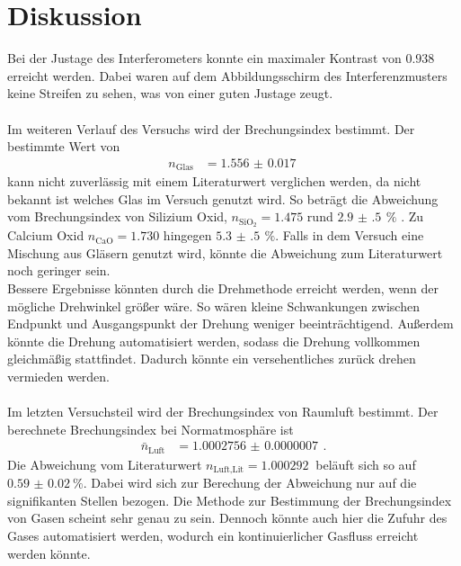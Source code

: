 \newpage
\section{Diskussion}
\label{sec:diskussion}
Bei der Justage des Interferometers konnte ein maximaler Kontrast von $0.938$ erreicht werden.
Dabei waren auf dem Abbildungsschirm des Interferenzmusters keine Streifen zu sehen, was von einer guten Justage zeugt.\\\\
Im weiteren Verlauf des Versuchs wird der Brechungsindex bestimmt.
Der bestimmte Wert von 
\begin{align*}
    n_\text{Glas} &= \SI{1.556(17)}{}
\end{align*}
kann nicht zuverlässig mit einem Literaturwert verglichen werden, da nicht bekannt ist welches Glas im Versuch genutzt wird.
So beträgt die Abweichung vom Brechungsindex von Silizium Oxid, $n_{\text{SiO}_2} = 1.475$ rund $\SI{2.9(5)}{} \,\%$ \cite{Teschner2019}.
Zu Calcium Oxid $n_\text{CaO} = 1.730$ hingegen $\SI{5.3(5)}{}\,\%$.
Falls in dem Versuch eine Mischung aus Gläsern genutzt wird, könnte die Abweichung zum Literaturwert noch geringer sein.\\
Bessere Ergebnisse könnten durch die Drehmethode erreicht werden, wenn der mögliche Drehwinkel größer wäre.
So wären kleine Schwankungen zwischen Endpunkt und Ausgangspunkt der Drehung weniger beeinträchtigend.
Außerdem könnte die Drehung automatisiert werden, sodass die Drehung vollkommen gleichmäßig stattfindet.
Dadurch könnte ein versehentliches zurück drehen vermieden werden.\\\\
Im letzten Versuchsteil wird der Brechungsindex von Raumluft bestimmt.
Der berechnete Brechungsindex bei Normatmosphäre ist
\begin{align*}
    \bar{n}_\text{Luft} &= \SI{1.0002756(07)}{}\,.
\end{align*}
Die Abweichung vom Literaturwert ${n_\text{Luft,Lit} = \SI{1.000292}{}}$ \cite{Dem2} beläuft sich so auf ${\SI{0.59(2)}{\percent}}$.
Dabei wird sich zur Berechung der Abweichung nur auf die signifikanten Stellen bezogen.
Die Methode zur Bestimmung der Brechungsindex von Gasen scheint sehr genau zu sein.
Dennoch könnte auch hier die Zufuhr des Gases automatisiert werden, wodurch ein kontinuierlicher Gasfluss erreicht werden könnte.